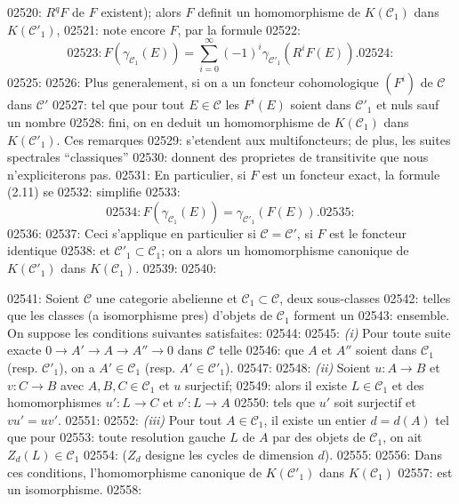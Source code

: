 02520: $R^qF$ de $F$ existent); alors $F$ definit un homomorphisme de $K(\mathcal{C}_1)$ dans $K(\mathcal{C}'_1)$,
02521: note encore $F$, par la formule
02522: \begin{equation}
02523: F(\gamma_{\mathcal{C}_1}(E)) = \sum_{i=0}^{\infty} (-1)^i \gamma_{\mathcal{C}'_1}(R^i F(E)).
02524: \end{equation}
02525: 
02526: Plus generalement, si on a un foncteur cohomologique $(F^i)$ de $\mathcal{C}$ dans $\mathcal{C}'$
02527: tel que pour tout $E \in \mathcal{C}$ les $F^i(E)$ soient dans $\mathcal{C}'_1$ et nuls sauf un nombre
02528: fini, on en deduit un homomorphisme de $K(\mathcal{C}_1)$ dans $K(\mathcal{C}'_1)$. Ces remarques
02529: s'etendent aux multifoncteurs; de plus, les suites spectrales ``classiques''
02530: donnent des proprietes de transitivite que nous n'expliciterons pas.
02531: En particulier, si $F$ est un foncteur exact, la formule (2.11) se
02532: simplifie
02533: \begin{equation}
02534: F(\gamma_{\mathcal{C}_1}(E)) = \gamma_{\mathcal{C}'_1}(F(E)).
02535: \end{equation}
02536: 
02537: Ceci s'applique en particulier si $\mathcal{C} = \mathcal{C}'$, si $F$ est le foncteur identique
02538: et $\mathcal{C}'_1 \subset \mathcal{C}_1$; on a alors un homomorphisme canonique de $K(\mathcal{C}'_1)$ dans $K(\mathcal{C}_1)$.
02539: 
02540: \begin{theorem}
02541: Soient $\mathcal{C}$ une categorie abelienne et $\mathcal{C}_1 \subset \mathcal{C}$, deux sous-classes
02542: telles que les classes (a isomorphisme pres) d'objets de $\mathcal{C}_1$ forment un
02543: ensemble. On suppose les conditions suivantes satisfaites:
02544: 
02545: \textit{(i)} Pour toute suite exacte $0 \to A' \to A \to A'' \to 0$ dans $\mathcal{C}$ telle
02546: que $A$ et $A''$ soient dans $\mathcal{C}_1$ (resp. $\mathcal{C}'_1$), on a $A' \in \mathcal{C}_1$ (resp. $A' \in \mathcal{C}'_1$).
02547: 
02548: \textit{(ii)} Soient $u: A \to B$ et $v: C \to B$ avec $A, B, C \in \mathcal{C}_1$ et $u$ surjectif;
02549: alors il existe $L \in \mathcal{C}_1$ et des homomorphismes $u': L \to C$ et $v': L \to A$
02550: tels que $u'$ soit surjectif et $vu' = uv'$.
02551: 
02552: \textit{(iii)} Pour tout $A \in \mathcal{C}_1$, il existe un entier $d = d(A)$ tel que pour
02553: toute resolution gauche $L$ de $A$ par des objets de $\mathcal{C}_1$, on ait $Z_d(L) \in \mathcal{C}_1$
02554: ($Z_d$ designe les cycles de dimension $d$).
02555: 
02556: Dans ces conditions, l'homomorphisme canonique de $K(\mathcal{C}'_1)$ dans $K(\mathcal{C}_1)$
02557: est un isomorphisme.
02558: \end{theorem}
